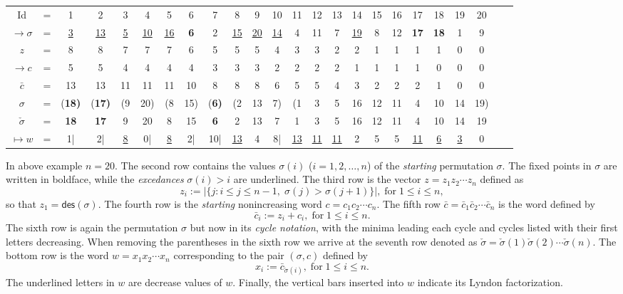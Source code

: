 \documentclass[12pt]{amsart}
\numberwithin{equation}{section}
\theoremstyle{plain}
\theoremstyle{definition}
\def\des{\mathsf{des}}
\def\U{\underline}
\def\B{\bf}
\begin{document}
{
\small
\setlength{\tabcolsep}{3pt}
\begin{center}












\begin{tabular}{c c c  c c c c c c c c c c c c c c c c c c c c c}
Id &=& 1&2&3&4&5&6&7&8&9&10&11&12&13&14&15&16&17&18&19&20 \\
$\rightarrow\sigma$ &=& {\U 3}&\U{13}&{\U 5}&\U{10}&\U{16}&{\B 6}&2& \U{15}& \U{20}& \U{14}&4&11&7& \U{19}&8&12& \B{17}& \B{18}&1&9 \\
$z $ & =& 8&8&7&7&7&6&5&5&5&4&3&3&2&2&1&1&1&1&0&0 \\
$\rightarrow c $ & =& 5&5&4&4&4&4&3&3&3&2&2&2&2&1&1&1&1&0&0&0 \\
$\bar c$ &=& 13&13&11&11&11&10&8&8&8&6&5&5&4&3&2&2&2&1&0&0 \\
$\sigma $&=& (\B{18})& (\B{17}) &(9&20)&(8&15)& (\B{6})&(2&13&7)&(1&3&5&16&12&11&4&10&14&19) \\
$\check\sigma$&=& \B{18}& \B{17}&9&20&8&15& \B{6}&2&13&7&1&3&5&16&12&11&4&10&14&19 \\
$\mapsto w$& =& 1\;|&2\;|& \U{8}&0\;|& \U{8}&2\;|&10\;|& \U{13}&4&8\;|& \U{13}& \U{11}& \U{11}&2&5&5& \U{11}& \U{6}& \U{3}&0\\
\end{tabular}
\end{center}
}

In above example $n=20$. The second row contains the values $\sigma(i)$ ($i=1,2,\ldots,n$) of the {\em starting} permutation $\sigma$. The fixed points in $\sigma$ are written in boldface, while the {\em excedances} $\sigma(i)>i$  are underlined. The third row is the vector $z=z_1z_2\cdots z_n$ defined as
\begin{equation}\label{def:z-seq}
z_i:=|\{j:i\le j\le n-1,\;\sigma(j)>\sigma(j+1)\}|, \; \text{for}\; 1\le i\le n,
\end{equation}
so that $z_1=\des(\sigma)$. The fourth row is the {\em starting} nonincreasing word $c=c_1c_2\cdots c_n$. The fifth row $\bar{c}=\bar c_1 \bar c_2 \cdots\bar c_n$ is the word defined by
\begin{equation*}
\bar c_i:=z_i+c_i,\; \text{for}\; 1\le i\le n.
\end{equation*}
The sixth row is again the permutation $\sigma$ but now in its {\em cycle notation}, with the minima leading each cycle and cycles listed with their first letters decreasing. When removing the parentheses in the sixth row we arrive at the seventh row denoted as $\check\sigma=\check\sigma(1)\check\sigma(2)\cdots\check\sigma(n)$. The bottom row is the word $w=x_1x_2\cdots x_n$ corresponding to the pair $(\sigma,c)$ defined by 
\begin{equation}\label{eq:w-barc}
x_i:=\bar c_{\check\sigma(i)},\;\text{for}\; 1\le i\le n.
\end{equation}
The underlined letters in $w$ are decrease values of $w$. Finally, the vertical bars inserted into $w$ indicate its Lyndon factorization.
\end{document}

